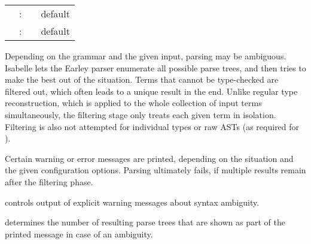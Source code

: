 \begin{isabellebody}
\begin{isamarkuptext}
\begin{description}
\begin{description}
  \end{description}

  \end{description}%
\end{isamarkuptext}%
\isamarkuptrue%
%
\isamarkuptrue%
%
\begin{isamarkuptext}%
\begin{tabular}{rcll}
    \indexdef{}{attribute}{syntax\_ambiguity\_warning}\hypertarget{attribute.syntax-ambiguity-warning}{\hyperlink{attribute.syntax-ambiguity-warning}{\mbox{\isa{syntax{\isaliteral{5F}{\isacharunderscore}}ambiguity{\isaliteral{5F}{\isacharunderscore}}warning}}}} & : & \isa{attribute} & default \isa{true} \\
    \indexdef{}{attribute}{syntax\_ambiguity\_limit}\hypertarget{attribute.syntax-ambiguity-limit}{\hyperlink{attribute.syntax-ambiguity-limit}{\mbox{\isa{syntax{\isaliteral{5F}{\isacharunderscore}}ambiguity{\isaliteral{5F}{\isacharunderscore}}limit}}}} & : & \isa{attribute} & default \isa{{\isadigit{1}}{\isadigit{0}}} \\
  \end{tabular}

  Depending on the grammar and the given input, parsing may be
  ambiguous.  Isabelle lets the Earley parser enumerate all possible
  parse trees, and then tries to make the best out of the situation.
  Terms that cannot be type-checked are filtered out, which often
  leads to a unique result in the end.  Unlike regular type
  reconstruction, which is applied to the whole collection of input
  terms simultaneously, the filtering stage only treats each given
  term in isolation.  Filtering is also not attempted for individual
  types or raw ASTs (as required for \hyperlink{command.translations}{\mbox{}}).

  Certain warning or error messages are printed, depending on the
  situation and the given configuration options.  Parsing ultimately
  fails, if multiple results remain after the filtering phase.

  \begin{description}

  \item \hyperlink{attribute.syntax-ambiguity-warning}{\mbox{}} controls output of
  explicit warning messages about syntax ambiguity.

  \item \hyperlink{attribute.syntax-ambiguity-limit}{\mbox{}} determines the number of
  resulting parse trees that are shown as part of the printed message
  in case of an ambiguity.


\end{description}
\end{isamarkuptext}
\end{isabellebody}
